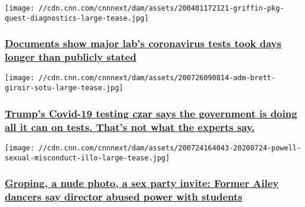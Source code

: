 \href{/2020/08/07/politics/quest-lab-coronavirus-tests-longer-public-internal-documents/index.html}{}

\texttt{[image: //cdn.cnn.com/cnnnext/dam/assets/200401172121-griffin-pkg-quest-diagnostics-large-tease.jpg]}

\hypertarget{documents-show-major-labs-coronavirus-tests-took-days-longer-than-publicly-stated-}{%
\subsubsection{\texorpdfstring{\href{/2020/08/07/politics/quest-lab-coronavirus-tests-longer-public-internal-documents/index.html}{Documents
show major lab's coronavirus tests took days longer than publicly stated
}}{Documents show major lab's coronavirus tests took days longer than publicly stated }}\label{documents-show-major-labs-coronavirus-tests-took-days-longer-than-publicly-stated-}}

\href{/2020/08/04/politics/giroir-covid-testing-efforts-invs/index.html}{}

\texttt{[image: //cdn.cnn.com/cnnnext/dam/assets/200726090814-adm-brett-giroir-sotu-large-tease.jpg]}

\hypertarget{trumps-covid-19-testing-czar-says-the-government-is-doing-all-it-can-on-tests-thats-not-what-the-experts-say}{%
\subsubsection{\texorpdfstring{\href{/2020/08/04/politics/giroir-covid-testing-efforts-invs/index.html}{Trump's
Covid-19 testing czar says the government is doing all it can on tests.
That's not what the experts
say.}}{Trump's Covid-19 testing czar says the government is doing all it can on tests. That's not what the experts say.}}\label{trumps-covid-19-testing-czar-says-the-government-is-doing-all-it-can-on-tests-thats-not-what-the-experts-say}}

\href{/2020/07/25/us/alvin-ailey-dance-school-troy-powell-investigation-invs/index.html}{}

\texttt{[image: //cdn.cnn.com/cnnnext/dam/assets/200724164043-20200724-powell-sexual-misconduct-illo-large-tease.jpg]}

\hypertarget{groping-a-nude-photo-a-sex-party-invite-former-ailey-dancers-say-director-abused-power-with-students-1}{%
\subsubsection{\texorpdfstring{\href{/2020/07/25/us/alvin-ailey-dance-school-troy-powell-investigation-invs/index.html}{Groping,
a nude photo, a sex party invite: Former Ailey dancers say director
abused power with
students}}{Groping, a nude photo, a sex party invite: Former Ailey dancers say director abused power with students}}\label{groping-a-nude-photo-a-sex-party-invite-former-ailey-dancers-say-director-abused-power-with-students-1}}

